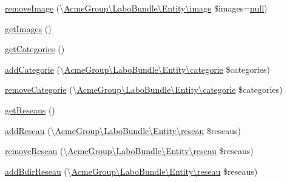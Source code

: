 \begin{DoxyCompactItemize}
\item 
\hyperlink{class_acme_group_1_1_labo_bundle_1_1_entity_1_1article_a746c11f35f960fae99079f4ecf041fb1}{remove\+Image} (\textbackslash{}\hyperlink{class_acme_group_1_1_labo_bundle_1_1_entity_1_1image}{Acme\+Group\textbackslash{}\+Labo\+Bundle\textbackslash{}\+Entity\textbackslash{}image} \$images=\hyperlink{validate_8js_afb8e110345c45e74478894341ab6b28e}{null})
\item 
\hyperlink{class_acme_group_1_1_labo_bundle_1_1_entity_1_1article_a1731fbfaa200f64828fa920ab2cad046}{get\+Images} ()
\item 
\hyperlink{class_acme_group_1_1_labo_bundle_1_1_entity_1_1article_ad036561967204b7f1322412326c9f226}{get\+Categories} ()
\item 
\hyperlink{class_acme_group_1_1_labo_bundle_1_1_entity_1_1article_ac3ea1c79e48d9b3aec89264697e4d97d}{add\+Categorie} (\textbackslash{}\hyperlink{class_acme_group_1_1_labo_bundle_1_1_entity_1_1categorie}{Acme\+Group\textbackslash{}\+Labo\+Bundle\textbackslash{}\+Entity\textbackslash{}categorie} \$categories)
\item 
\hyperlink{class_acme_group_1_1_labo_bundle_1_1_entity_1_1article_acaa5087ab4ec832f26f992bb05ecfdd9}{remove\+Categorie} (\textbackslash{}\hyperlink{class_acme_group_1_1_labo_bundle_1_1_entity_1_1categorie}{Acme\+Group\textbackslash{}\+Labo\+Bundle\textbackslash{}\+Entity\textbackslash{}categorie} \$categories)
\item 
\hyperlink{class_acme_group_1_1_labo_bundle_1_1_entity_1_1article_aa61643528ebe9fd387da792ccb21538c}{get\+Reseaus} ()
\item 
\hyperlink{class_acme_group_1_1_labo_bundle_1_1_entity_1_1article_ac6eb1ac325f063f9a4b14540ee7dfa40}{add\+Reseau} (\textbackslash{}\hyperlink{class_acme_group_1_1_labo_bundle_1_1_entity_1_1reseau}{Acme\+Group\textbackslash{}\+Labo\+Bundle\textbackslash{}\+Entity\textbackslash{}reseau} \$reseaus)
\item 
\hyperlink{class_acme_group_1_1_labo_bundle_1_1_entity_1_1article_afc542cc89094621585498b3b52352dac}{remove\+Reseau} (\textbackslash{}\hyperlink{class_acme_group_1_1_labo_bundle_1_1_entity_1_1reseau}{Acme\+Group\textbackslash{}\+Labo\+Bundle\textbackslash{}\+Entity\textbackslash{}reseau} \$reseaus)
\item 
\hyperlink{class_acme_group_1_1_labo_bundle_1_1_entity_1_1article_af9e23b22b8ca9c1eddf5853b9303af61}{add\+Bdir\+Reseau} (\textbackslash{}\hyperlink{class_acme_group_1_1_labo_bundle_1_1_entity_1_1reseau}{Acme\+Group\textbackslash{}\+Labo\+Bundle\textbackslash{}\+Entity\textbackslash{}reseau} \$reseaus)

\end{DoxyCompactItemize}
